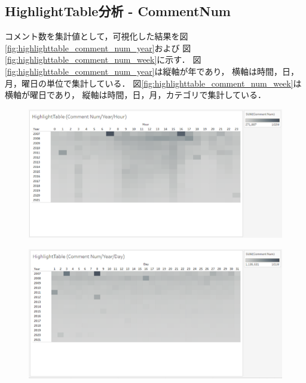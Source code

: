 \documentclass[submit,techrep,noauthor]{ipsj}
\begin{document}
\newpage
\subsection{HighlightTable分析 - CommentNum}
コメント数を集計値として，可視化した結果を図\ref{fig:highlighttable_comment_num_year}および
図\ref{fig:highlighttable_comment_num_week}に示す．
%
図\ref{fig:highlighttable_comment_num_year}は縦軸が年であり，
横軸は時間，日，月，曜日の単位で集計している．
図\ref{fig:highlighttable_comment_num_week}は横軸が曜日であり，
縦軸は時間，日，月，カテゴリで集計している．

\vspace{-1.5zh}
\begin{figure}[h]
  \begin{minipage}[b]{0.49\columnwidth}
    \centering
    \includegraphics[width=\columnwidth]{./eps/HighlightTable_CommentNum_YearHour.eps}
    \label{fig:highlighttable_comment_num_yearhour}
  \end{minipage}
  \begin{minipage}[b]{0.49\columnwidth}
    \centering
    \includegraphics[width=\columnwidth]{./eps/HighlightTable_CommentNum_YearDay.eps}
    \label{fig:highlighttable_comment_num_yearday}

\end{minipage}
\end{figure}
\end{document}
